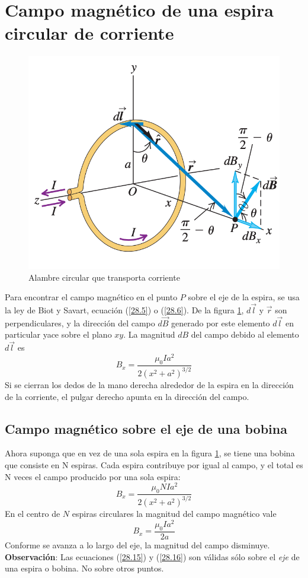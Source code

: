 \section{Campo magnético de una espira circular de corriente}
\begin{figure}[h]
\includegraphics[scale=0.6]{fig/image3}
\centering
\caption{Alambre circular que transporta corriente}
\label{fig3}
\end{figure}
Para encontrar el campo magnético en el punto $P$ sobre el eje de la espira, se usa la ley de Biot y Savart, ecuación (\ref{28.5}) o (\ref{28.6}). De la figura \ref{fig3}, $d\vec{l}$ y $\vec{r}$ son perpendiculares, y la dirección del campo $d\vec{B}$ generado por este elemento $d\vec{l}$ en particular yace sobre el plano $xy$. La magnitud $dB$ del campo debido al elemento $d\vec{l}$ es
\begin{equation}\label{28.15}
\boxed{B_x=\frac{\mu_0Ia^2}{2(x^2+a^2)^{3/2}}}
\end{equation}
Si se cierran los dedos de la mano derecha alrededor de la espira en la dirección de la corriente, el pulgar derecho apunta en la dirección del campo.
\subsection{Campo magnético sobre el eje de una bobina}
Ahora suponga que en vez de una sola espira en la figura \ref{fig3}, se tiene una bobina que consiste en N espiras. Cada espira contribuye por igual al campo, y el total es N veces el campo producido por una sola espira:
\begin{equation}\label{28.16}
B_x=\frac{\mu_0NIa^2}{2(x^2+a^2)^{3/2}}
\end{equation}
En el centro de $N$ espiras circulares la magnitud del campo magnético vale
\begin{equation}\label{28.17}
\boxed{B_x=\frac{\mu_0Ia^2}{2a}}
\end{equation}
Conforme se avanza a lo largo del eje, la magnitud del campo disminuye.
\textbf{Observación}: Las ecuaciones (\ref{28.15}) y (\ref{28.16}) son válidas sólo sobre el \textit{eje} de una espira o bobina. No sobre otros puntos.


